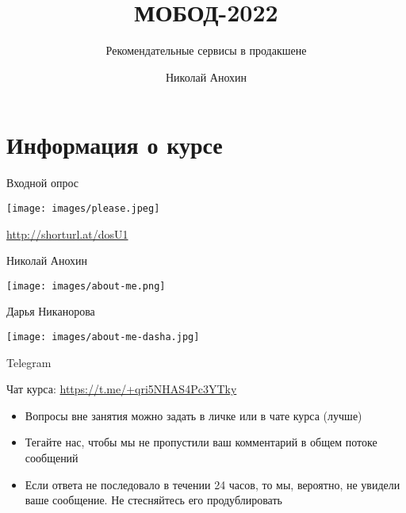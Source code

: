 \documentclass[11pt,aspectratio=169]{beamer}
\author{Николай Анохин}
\title{МОБОД-2022}
\subtitle{Рекомендательные сервисы в продакшене}
\begin{document}
{

\begin{frame}
\titlepage
\end{frame}


}

\section{Информация о курсе}

\begin{frame}{Входной опрос}

\begin{center}
\texttt{[image: images/please.jpeg]}

\url{http://shorturl.at/dosU1}
\end{center}

\end{frame}

\begin{frame}{Николай Анохин}

\begin{center}
\texttt{[image: images/about-me.png]}
\end{center}

\end{frame}

\begin{frame}{Дарья Никанорова}

\begin{center}
\texttt{[image: images/about-me-dasha.jpg]}
\end{center}

\end{frame}

\begin{frame}{Telegram}

Чат курса: \url{https://t.me/+qri5NHAS4Pc3YTky}

\vfill

\begin{itemize}
\item Вопросы вне занятия можно задать в личке или в чате курса (лучше)
\item Тегайте нас, чтобы мы не пропустили ваш комментарий в общем потоке сообщений
\item Если ответа не последовало в течении 24 часов, то мы, вероятно, не увидели ваше сообщение. Не стесняйтесь его продублировать
\end{itemize}

\end{frame}
\end{document}
